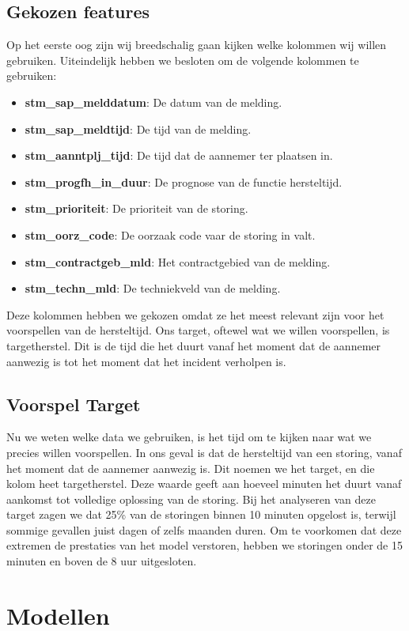 \documentclass{article}
\begin{document}
\subsection{Gekozen features}
Op het eerste oog zijn wij breedschalig gaan kijken welke kolommen wij willen gebruiken. Uiteindelijk hebben we besloten om de volgende kolommen te gebruiken:
\begin{itemize}
  \item \textbf{stm\_sap\_melddatum}: De datum van de melding.
  \item \textbf{stm\_sap\_meldtijd}: De tijd van de melding.
  \item \textbf{stm\_aanntplj\_tijd}: De tijd dat de aannemer ter plaatsen in. 
  \item \textbf{stm\_progfh\_in\_duur}: De prognose van de functie hersteltijd.
  \item \textbf{stm\_prioriteit}: De prioriteit van de storing.
  \item \textbf{stm\_oorz\_code}: De oorzaak code vaar de storing in valt.
  \item \textbf{stm\_contractgeb\_mld}: Het contractgebied van de melding.
  \item \textbf{stm\_techn\_mld}: De techniekveld van de melding.
\end{itemize}
Deze kolommen hebben we gekozen omdat ze het meest relevant zijn voor het voorspellen van de hersteltijd. Ons target, oftewel wat we willen voorspellen, is targetherstel. Dit is de tijd die het duurt vanaf het moment dat de aannemer aanwezig is tot het moment dat het incident verholpen is.

\subsection{Voorspel Target}
Nu we weten welke data we gebruiken, is het tijd om te kijken naar wat we precies willen voorspellen. In ons geval is dat de hersteltijd van een storing, vanaf het moment dat de aannemer aanwezig is. Dit noemen we het target, en die kolom heet targetherstel. Deze waarde geeft aan hoeveel minuten het duurt vanaf aankomst tot volledige oplossing van de storing. Bij het analyseren van deze target zagen we dat 25\% van de storingen binnen 10 minuten opgelost is, terwijl sommige gevallen juist dagen of zelfs maanden duren. Om te voorkomen dat deze extremen de prestaties van het model verstoren, hebben we storingen onder de 15 minuten en boven de 8 uur uitgesloten.

\newpage
\section{Modellen}
\end{document}
